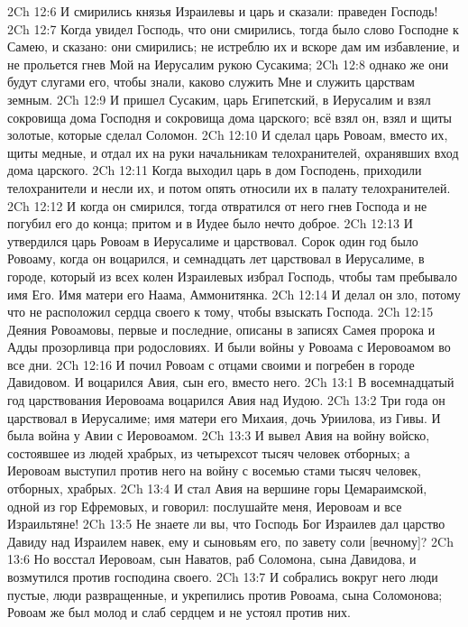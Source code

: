 \vs 2Ch 12:6 И смирились князья Израилевы и царь и сказали: праведен Господь!
\vs 2Ch 12:7 Когда увидел Господь, что они смирились, тогда было слово Господне к Самею, и сказано: они смирились; не истреблю их и вскоре дам им избавление, и не прольется гнев Мой на Иерусалим рукою Сусакима;
\vs 2Ch 12:8 однако же они будут слугами его, чтобы знали, каково служить Мне и служить царствам земным.
\vs 2Ch 12:9 И пришел Сусаким, царь Египетский, в Иерусалим и взял сокровища дома Господня и сокровища дома царского; всё взял он, взял и щиты золотые, которые сделал Соломон.
\vs 2Ch 12:10 И сделал царь Ровоам, вместо их, щиты медные, и отдал их на руки начальникам телохранителей, охранявших вход дома царского.
\vs 2Ch 12:11 Когда выходил царь в дом Господень, приходили телохранители и несли их, и потом опять относили их в палату телохранителей.
\vs 2Ch 12:12 И когда он смирился, тогда отвратился от него гнев Господа и не погубил его до конца; притом и в Иудее было нечто доброе.
\rsbpar\vs 2Ch 12:13 И утвердился царь Ровоам в Иерусалиме и царствовал. Сорок один год было Ровоаму, когда он воцарился, и семнадцать лет царствовал в Иерусалиме, в городе, который из всех колен Израилевых избрал Господь, чтобы там пребывало имя Его. Имя матери его Наама, Аммонитянка.
\vs 2Ch 12:14 И делал он зло, потому что не расположил сердца своего к тому, чтобы взыскать Господа.
\rsbpar\vs 2Ch 12:15 Деяния Ровоамовы, первые и последние, описаны в записях Самея пророка и Адды прозорливца при родословиях. И были войны у Ровоама с Иеровоамом во все дни.
\vs 2Ch 12:16 И почил Ровоам с отцами своими и погребен в городе Давидовом. И воцарился Авия, сын его, вместо него.
\vs 2Ch 13:1 В восемнадцатый год царствования Иеровоама воцарился Авия над Иудою.
\vs 2Ch 13:2 Три года он царствовал в Иерусалиме; имя матери его Михаия, дочь Уриилова, из Гивы. И была война у Авии с Иеровоамом.
\vs 2Ch 13:3 И вывел Авия на войну войско, состоявшее из людей храбрых, из четырехсот тысяч человек отборных; а Иеровоам выступил против него на войну с восемью стами тысяч человек,  отборных, храбрых.
\vs 2Ch 13:4 И стал Авия на вершине горы Цемараимской, одной из гор Ефремовых, и говорил: послушайте меня, Иеровоам и все Израильтяне!
\vs 2Ch 13:5 Не знаете ли вы, что Господь Бог Израилев дал царство Давиду над Израилем навек, ему и сыновьям его, по завету соли [вечному]?
\vs 2Ch 13:6 Но восстал Иеровоам, сын Наватов, раб Соломона, сына Давидова, и возмутился против господина своего.
\vs 2Ch 13:7 И собрались вокруг него люди пустые, люди развращенные, и укрепились против Ровоама, сына Соломонова; Ровоам же был молод и слаб сердцем и не устоял против них.
